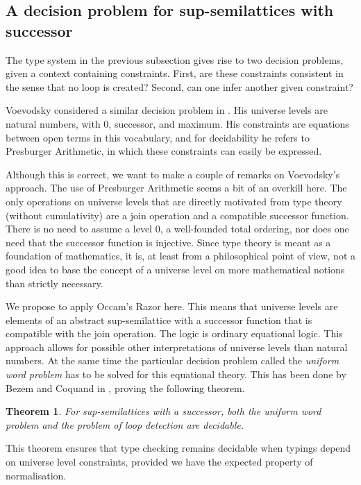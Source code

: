 \documentclass[11pt,a4paper]{article}
\newtheorem{theorem}{Theorem}[section]
\theoremstyle{definition}
\begin{document}
\subsection{A decision problem for sup-semilattices with successor}

The type system in the previous subsection gives rise to two
decision problems, given a context containing constraints. 
First, are these constraints consistent in the sense that no loop is created?
Second, can one infer another given constraint?

Voevodsky considered a similar decision problem in \cite[Section 2]{VV}.
His universe levels are natural numbers, with 0, successor, and maximum.
His constraints are equations between open terms in this vocabulary,
and for decidability he refers to Presburger Arithmetic,
in which these constraints can easily be expressed.

Although this is correct, we want to make a couple of remarks on Voevodsky's approach.
The use of Presburger Arithmetic seems a bit of an overkill here.
The only operations on universe levels that are directly motivated
from type theory (without cumulativity) are a join operation and a compatible successor function.
There is no need to assume a level 0, a well-founded total ordering,
nor does one need that the successor function is injective.
Since type theory is meant as a foundation of mathematics, it is,
at least from a philosophical point of view,
not a good idea to base the concept of a universe level
on more mathematical notions than strictly necessary.

We propose to apply Occam's Razor here. This means that universe levels
are elements of an abstract sup-semilattice with a successor function
that is compatible with the join operation. The logic is ordinary
equational logic.
This approach allows for possible other interpretations of universe levels
than natural numbers. At the same time the particular decision problem
called the \emph{uniform word problem} has to be solved for this equational theory.
This has been done by Bezem and Coquand in \cite{bezem-coquand:lattices},
proving the following theorem.

\begin{theorem}\label{thm:P-solvability}
For sup-semilattices with a successor, both the uniform word problem
and the problem of loop detection are decidable.
\end{theorem}
This theorem ensures that type checking remains decidable when
typings depend on universe level constraints, provided we have the expected property of normalisation.
\end{document}
